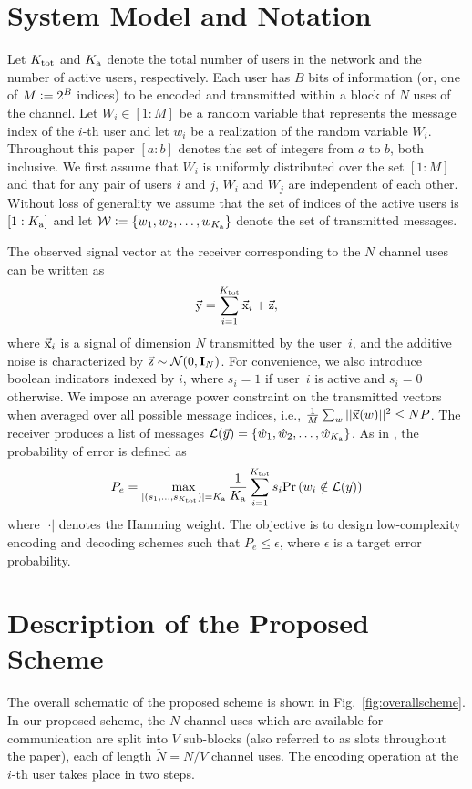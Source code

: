 \section{System Model and Notation}
\label{Sec:SystemModel}
Let $K_{\text{tot}}$ and $K_{\text{a}}$ denote the total number of users in the network and the number of active users, respectively.  Each user has $B$ bits of information (or, one of $M \mathrel{\mathop:}= 2^B$ indices) to be encoded and transmitted within a block of $N$ uses of the channel. Let $W_i \in [1:M]$ be a random variable that represents the message index of the $i$-th user and let $w_i$ be a realization of the random variable $W_i$. Throughout this paper $[a:b]$ denotes the set of integers from $a$ to $b$, both inclusive. We first assume that $W_i$ is uniformly distributed over the set $[1:M]$ and that for any pair of users $i$ and $j$, $W_i$ and $W_j$ are independent of each other.  Without loss of generality we assume that the set of indices of the active users is $[1:K_{\text{a}}]$ and let $\mathcal{W}\mathrel{\mathop:}=\{w_1,w_2,\ldots,w_{K_{\text{a}}}\}$ denote the set of transmitted messages.

The observed signal vector at the receiver corresponding to the $N$ channel uses can be written as
\begin{equation}
\vec{\mathrm{y}} = \sum_{i=1}^{K_{\text{tot}}} \vec{\mathrm{x}}_{i} + \vec{\mathrm{z}},
\end{equation}
where $\vec{\mathrm{x}}_i$ is a signal of dimension $N$ transmitted by the user~$i$, and the additive noise is characterized by $\vec{\mathrm{z}} \sim \mathcal{N}(0,\mathbf{I}_N)$. For convenience, we also introduce boolean indicators indexed by $i$, where $s_i =1$ if user~$i$ is active and $s_i = 0$ otherwise. We impose an average power constraint on the transmitted vectors when averaged over all possible message indices, i.e., $\frac{1}{M}\sum_{w} ||\vec{\mathrm{x}}(w)||^2\leq NP$.  The receiver produces a list of messages $\mathcal{L}(\vec{y}) = \{\hat{w}_1,\hat{w}_2,\ldots,\hat{w}_{K_{\text{a}}} \}$. As in \cite{ordentlich2017low}, the probability of error is defined as
\begin{equation}\label{eqn:proboferrordefinition}
  P_e = \max_{|(s_1,\ldots,s_{K_{\text{tot}}})| = K_{\text{a}}} \frac{1}{K_{\text{a}}} \sum_{i=1}^{K_{\text{tot}}} s_i \mathrm{Pr}\left( w_i \notin \mathcal{L}(\vec{y}) \right)
\end{equation}
where $|\cdot|$ denotes the Hamming weight. The objective is to design low-complexity encoding and decoding schemes such that $P_e \leq \epsilon$, where $\epsilon$ is a target error probability.

\section{Description of the Proposed Scheme}
The overall schematic of the proposed scheme is shown in Fig.~\ref{fig:overallscheme}. In our proposed scheme, the $N$ channel uses which are available for communication are split into $V$ sub-blocks (also referred to as slots throughout the paper), each of length $\tilde{N}=N/V$ channel uses. The encoding operation at the $i$-th user takes place in two steps.

